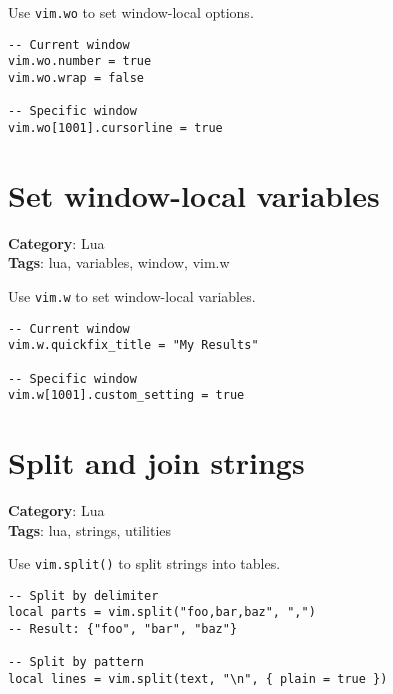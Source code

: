 {{{{{{{Use {\footnotesize \Verb§vim.wo§} to set window-local options.

\begin{Exa*}{}
\begin{Verbatim}[fontsize=\footnotesize, breaklines, breakanywhere]
-- Current window
vim.wo.number = true
vim.wo.wrap = false

-- Specific window
vim.wo[1001].cursorline = true
\end{Verbatim}
\end{Exa*}

\section{Set window-local variables}

\textbf{Category}: Lua\\ \textbf{Tags}: lua, variables, window, vim.w
\vspace{0.5cm}

Use {\footnotesize \Verb§vim.w§} to set window-local variables.

\begin{Exa*}{}
\begin{Verbatim}[fontsize=\footnotesize, breaklines, breakanywhere]
-- Current window
vim.w.quickfix_title = "My Results"

-- Specific window
vim.w[1001].custom_setting = true
\end{Verbatim}
\end{Exa*}

\section{Split and join strings}

\textbf{Category}: Lua\\ \textbf{Tags}: lua, strings, utilities
\vspace{0.5cm}

Use {\footnotesize \Verb§vim.split()§} to split strings into tables.

\begin{Exa*}{}
\begin{Verbatim}[fontsize=\footnotesize, breaklines, breakanywhere]
-- Split by delimiter
local parts = vim.split("foo,bar,baz", ",")
-- Result: {"foo", "bar", "baz"}

-- Split by pattern
local lines = vim.split(text, "\n", { plain = true })
\end{Verbatim}
\end{Exa*}

}}}}}}}
